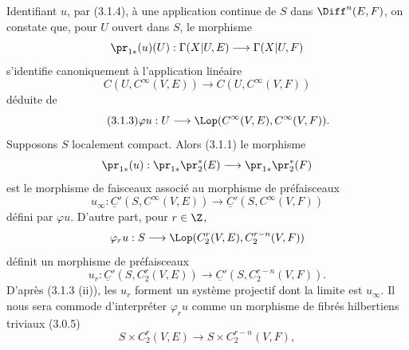 Identifiant $u$, par (3.1.4), à une application continue de $S$ dans $\Diff^n(E,F)$, on constate que, pour $U$ ouvert dans $S$, le morphisme
\[
  \pr_{1*}(u)(U):\Gamma(X|U,E)\longrightarrow \Gamma(X|U,F)
\]
s'identifie canoniquement à l'application linéaire
\[
  C(U,C^\infty(V,E))\longrightarrow C(U,C^\infty(V,F))
\]
déduite de
\begin{equation}\tag{3.1.3}
  \varphi u:U\longrightarrow \Lop(C^\infty(V,E),C^\infty(V,F)).
\end{equation}
Supposons $S$ localement compact. Alors (3.1.1) le morphisme
\[
  \pr_{1*}(u):\pr_{1*}\pr_2^*(E)
  \longrightarrow \pr_{1*}\pr_2^*(F)
\]
est le morphisme de faisceaux associé au morphisme de préfaisceaux
\[
  u_\infty:\underline C'(S,C^\infty(V,E))
  \longrightarrow \underline C'(S,C^\infty(V,F))
\]
défini par $\varphi u$. D'autre part, pour $r\in\Z$,
\[
  \varphi_r u:S\longrightarrow \Lop(C^r_2(V,E),C^{r-n}_2(V,F))
\]
définit un morphisme de préfaisceaux
\[
  u_r:\underline C'(S,C^r_2(V,E))
  \longrightarrow \underline C'(S,C^{r-n}_2(V,F)).
\]
D'après (3.1.3 (ii)), les $u_r$ forment un système projectif dont la limite est $u_\infty$. Il nous sera commode d'interpréter $\varphi_r u$ comme un morphisme de fibrés hilbertiens triviaux (3.0.5)
\[
  S\times C^r_2(V,E)\longrightarrow S\times C^{r-n}_2(V,F),
\]
